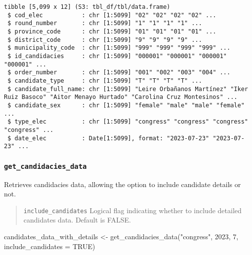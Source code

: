 \documentclass[
  letterpaper,
  DIV=11,
  numbers=noendperiod]{scrreprt}
\newenvironment{Shaded}{\begin{snugshade}}{\end{snugshade}}
\newcommand{\AttributeTok}[1]{\textcolor[rgb]{0.40,0.45,0.13}{#1}}
\newcommand{\ConstantTok}[1]{\textcolor[rgb]{0.56,0.35,0.01}{#1}}
\newcommand{\DecValTok}[1]{\textcolor[rgb]{0.68,0.00,0.00}{#1}}
\newcommand{\FunctionTok}[1]{\textcolor[rgb]{0.28,0.35,0.67}{#1}}
\newcommand{\NormalTok}[1]{\textcolor[rgb]{0.00,0.23,0.31}{#1}}
\newcommand{\OtherTok}[1]{\textcolor[rgb]{0.00,0.23,0.31}{#1}}
\newcommand{\StringTok}[1]{\textcolor[rgb]{0.13,0.47,0.30}{#1}}
\begin{document}
\begin{verbatim}
tibble [5,099 x 12] (S3: tbl_df/tbl/data.frame)
 $ cod_elec           : chr [1:5099] "02" "02" "02" "02" ...
 $ round_number       : chr [1:5099] "1" "1" "1" "1" ...
 $ province_code      : chr [1:5099] "01" "01" "01" "01" ...
 $ district_code      : chr [1:5099] "9" "9" "9" "9" ...
 $ municipality_code  : chr [1:5099] "999" "999" "999" "999" ...
 $ id_candidacies     : chr [1:5099] "000001" "000001" "000001" "000001" ...
 $ order_number       : chr [1:5099] "001" "002" "003" "004" ...
 $ candidate_type     : chr [1:5099] "T" "T" "T" "T" ...
 $ candidate_full_name: chr [1:5099] "Leire Orbañanos Martínez" "Iker Ruiz Basoco" "Aitor Menayo Hurtado" "Carolina Cruz Montesinos" ...
 $ candidate_sex      : chr [1:5099] "female" "male" "male" "female" ...
 $ type_elec          : chr [1:5099] "congress" "congress" "congress" "congress" ...
 $ date_elec          : Date[1:5099], format: "2023-07-23" "2023-07-23" ...
\end{verbatim}

\hypertarget{get_candidacies_data}{%
\subsubsection{\texorpdfstring{\texttt{get\_candidacies\_data}}{get\_candidacies\_data}}\label{get_candidacies_data}}

Retrieves candidacies data, allowing the option to include candidate
details or not.

\begin{quote}
\texttt{include\_candidates} Logical flag indicating whether to include
detailed candidates data. Default is FALSE.
\end{quote}

\begin{Shaded}
\begin{Highlighting}[]
\NormalTok{candidates\_data\_with\_details }\OtherTok{\textless{}{-}} \FunctionTok{get\_candidacies\_data}\NormalTok{(}\StringTok{"congress"}\NormalTok{,}
                                                     \DecValTok{2023}\NormalTok{, }
                                                     \DecValTok{7}\NormalTok{,}
                                                     \AttributeTok{include\_candidates =} \ConstantTok{TRUE}\NormalTok{)}
\end{Highlighting}
\end{Shaded}
\end{document}
